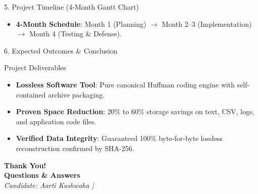 \documentclass[aspectratio=169,11pt]{beamer}
\begin{document}
\begin{frame}{5. Project Timeline (4-Month Gantt Chart)}
\begin{center}
{
    }
    \end{center}
    
    \vspace{0.1cm}
    \begin{itemize}
        \item \textbf{4-Month Schedule}: Month 1 (Planning) $\rightarrow$ Month 2--3 (Implementation) $\rightarrow$ Month 4 (Testing \& Defense).
    \end{itemize}
\end{frame}

\begin{frame}{6. Expected Outcomes \& Conclusion}
    \begin{block}{Project Deliverables}
        \begin{itemize}
            \item \textbf{Lossless Software Tool}: Pure canonical Huffman coding engine with self-contained archive packaging.
            \item \textbf{Proven Space Reduction}: 20\% to 60\% storage savings on text, CSV, logs, and application code files.
            \item \textbf{Verified Data Integrity}: Guaranteed 100\% byte-for-byte lossless reconstruction confirmed by SHA-256.
        \end{itemize}
    \end{block}

    \vspace{0.4cm}
    \begin{center}
        {\Large \textbf{Thank You!}}\\[0.3cm]
        {\large \textbf{Questions \& Answers}}\\[0.2cm]
        \textit{Candidate: Aarti Kushwaha \quad | }
    \end{center}
\end{frame}
\end{document}
